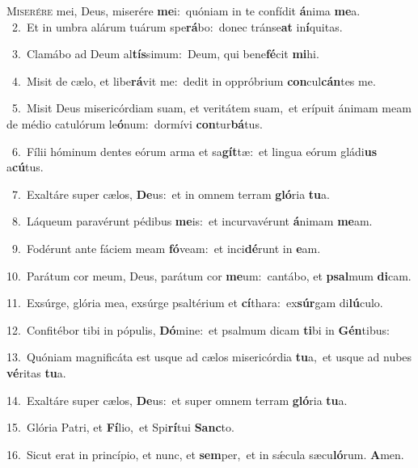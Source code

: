 \lettrine{\initial\textcolor{\initialcolor}{M}}{iserére} mei, Deus, miserére \textbf{me}\-i:~\star quóniam in te confídit \textbf{á}\-nima \textbf{me}\-a.\\
{\numbfont\textcolor{\numbcolor}{~2.}}~Et in umbra alárum tuárum spe\-\textbf{rá}\-bo:~\star donec tránse\textbf{at} in\-\textbf{í}\-quitas.\par
{\numbfont\textcolor{\numbcolor}{~3.}}~Clamábo ad Deum al\-\textbf{tís}\-simum:~\star Deum, qui bene\-\textbf{fé}\-cit \textbf{mi}\-hi.\par
{\numbfont\textcolor{\numbcolor}{~4.}}~Misit de cælo, et libe\-\textbf{rá}\-vit me:~\star dedit in oppróbrium \textbf{con}\-cul\-\textbf{cán}\-tes me.\par
{\numbfont\textcolor{\numbcolor}{~5.}}~Misit Deus misericórdiam suam, et veritátem suam,~\dagger et erípuit ánimam meam de médio catulórum le\-\textbf{ó}\-num:~\star dormívi \textbf{con}\-tur\-\textbf{bá}\-tus.\par
{\numbfont\textcolor{\numbcolor}{~6.}}~Fílii hóminum dentes eórum arma et sa\-\textbf{gít}\-tæ:~\star et lingua eórum gládi\textbf{us} a\-\textbf{cú}\-tus.\par
{\numbfont\textcolor{\numbcolor}{~7.}}~Exaltáre super cælos, \textbf{De}\-us:~\star et in omnem terram \textbf{gló}\-ria \textbf{tu}\-a.\par
{\numbfont\textcolor{\numbcolor}{~8.}}~Láqueum paravérunt pédibus \textbf{me}\-is:~\star et incurvavérunt \textbf{á}\-nimam \textbf{me}\-am.\par
{\numbfont\textcolor{\numbcolor}{~9.}}~Fodérunt ante fáciem meam \textbf{fó}\-veam:~\star et inci\-\textbf{dé}\-runt in \textbf{e}\-am.\par
{\numbfont\textcolor{\numbcolor}{10.}}~Parátum cor meum, Deus, parátum cor \textbf{me}\-um:~\star cantábo, et \textbf{psal}\-mum \textbf{di}\-cam.\par
{\numbfont\textcolor{\numbcolor}{11.}}~Exsúrge, glória mea, exsúrge psaltérium et \textbf{cí}\-thara:~\star ex\-\textbf{súr}\-gam di\-\textbf{lú}\-culo.\par
{\numbfont\textcolor{\numbcolor}{12.}}~Confitébor tibi in pópulis, \textbf{Dó}\-mine:~\star et psalmum dicam \textbf{ti}\-bi in \textbf{Gén}\-tibus:\par
{\numbfont\textcolor{\numbcolor}{13.}}~Quóniam magnificáta est usque ad cælos misericórdia \textbf{tu}\-a,~\star et usque ad nubes \textbf{vé}\-ritas \textbf{tu}\-a.\par
{\numbfont\textcolor{\numbcolor}{14.}}~Exaltáre super cælos, \textbf{De}\-us:~\star et super omnem terram \textbf{gló}\-ria \textbf{tu}\-a.\par
{\numbfont\textcolor{\numbcolor}{15.}}~Glória Patri, et \textbf{Fí}\-lio,~\star et Spi\-\textbf{rí}\-tui \textbf{Sanc}\-to.\par
{\numbfont\textcolor{\numbcolor}{16.}}~Sicut erat in princípio, et nunc, et \textbf{sem}\-per,~\star et in sǽcula sæcu\-\textbf{ló}\-rum. \textbf{A}\-men.\par
